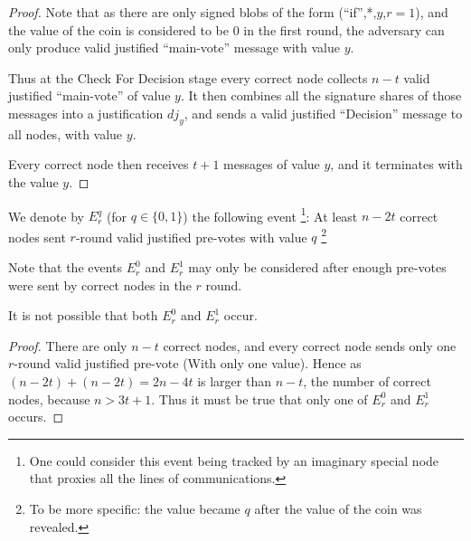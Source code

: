 \begin{proof}
  Note that as there are only signed blobs of the form (``if'',*,$y$,$r=1$), and
  the value of the coin is considered to be $0$ in the first round, the
  adversary can only produce valid justified ``main-vote'' message with value
  $y$.

  Thus at the Check For Decision stage every correct node collects $n-t$
  valid justified ``main-vote'' of value $y$. It then combines all the signature
  shares of those messages into a justification ${dj}_y$, and sends a
  valid justified ``Decision'' message to all nodes, with value $y$.

  Every correct node then receives $t+1$ messages of value $y$, and it
  terminates with the value $y$. 
\end{proof}

\begin{defn}
  We denote by $E_r^q$ (for $q \in \{0,1\}$) the following event \footnote{One
    could consider this event being tracked by an imaginary special node that
  proxies all the lines of communications.}: At least
  $n-2t$ correct nodes sent $r$-round valid justified pre-votes with value $q$
  \footnote{To be more specific: the value became $q$ after the value of the
  coin was revealed.} 

  Note that the events $E_r^0$ and $E_r^1$ may only be considered after enough
  pre-votes were sent by correct nodes in the $r$ round.
\end{defn}

\begin{lem}
  It is not possible that both $E_r^0$ and $E_r^1$ occur.
\end{lem}
\begin{proof}
  There are only $n-t$ correct nodes, and every correct node sends only one
  $r$-round valid justified pre-vote (With only one value). Hence as $(n-2t) +
  (n-2t) = 2n - 4t$ is larger than $n-t$, the number of correct nodes, because
  $n > 3t + 1$. Thus it must be true that only one of $E_r^0$ and $E_r^1$
  occurs.
\end{proof}

